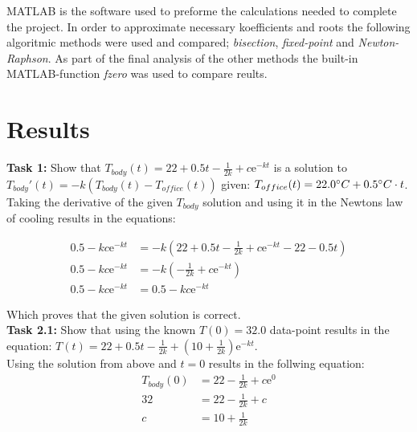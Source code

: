 \documentclass{article}
\begin{document}
MATLAB is the software used to preforme the calculations needed to complete the
project. In order to approximate necessary koefficients and roots the following
algoritmic methods were used and compared; \textit{bisection}, \textit{fixed-point} and
\textit{Newton-Raphson}. As part of the final analysis of the other methods
the built-in MATLAB-function \textit{fzero} was used to compare reults.

\section*{Results}

  \textbf{Task 1:}
  Show that
  $T_{body}(t) = 22 + 0.5t - \frac{1}{2k} + c\mathrm{e}^{-kt}$ is a solution to
  \\
  $T_{body}'(t) = -k(T_{body}(t) - T_{office}(t))$
  given:
  $T_{office}(t) = 22.0{\degree}C + 0.5{\degree}C \cdot t $. \\

  \noindent
  Taking the derivative of the given $T_{body}$ solution and using it in the
  Newtons law of cooling results in the equations:

  \noindent
  \begin{align*}
    0.5 -kc\mathrm{e}^{-kt} &= -k(22 + 0.5t - \frac{1}{2k} + c\mathrm{e}^{-kt}
    - 22 - 0.5t) \\
    0.5 -kc\mathrm{e}^{-kt} &= -k(-\frac{1}{2k} + c\mathrm{e}^{-kt}) \\
    0.5 -kc\mathrm{e}^{-kt} &= 0.5 - kc\mathrm{e}^{-kt}
  \end{align*}


  \noindent
  Which proves that the given solution is correct. \\


  \noindent
  \textbf{Task 2.1:}
  Show that using the known $T(0) = 32.0$ data-point results in the equation:
  $T(t) = 22 + 0.5t - \frac{1}{2k} + (10 + \frac{1}{2k})\mathrm{e}^{-kt}$. \\

  \noindent
  Using the solution from above and $t=0$ results in the follwing equation:
  \begin{align*}
    T_{body}(0) &= 22 - \frac{1}{2k} + c\mathrm{e}^{0} \\
    32 &= 22 - \frac{1}{2k} + c \\
    c  &= 10 + \frac{1}{2k}
  \end{align*}
\end{document}
